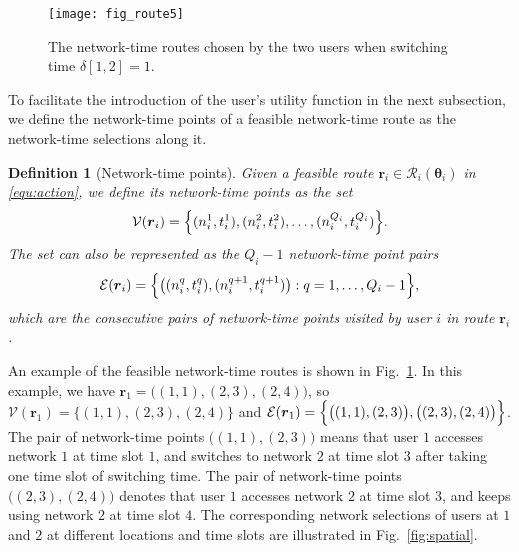 \documentclass[journal]{IEEEtran}
\newcommand{\bs}[1]{\boldsymbol{#1}}
\newtheorem{definition}{Definition}
\begin{document}
\begin{figure}[t]
 \centering
	 \texttt{[image: fig\_route5]} %
 \caption{The network-time routes chosen by the two users when switching time $\delta[1,2] = 1$. } %
\label{fig:route}
\end{figure}




  To facilitate the introduction of the user's utility function in the next subsection, %
  we define the network-time points of a feasible network-time route as the network-time selections along it.
	
\begin{definition}[Network-time points]
  Given a feasible route $\boldsymbol{r}_i \in \mathcal{R}_i(\boldsymbol{\theta}_i)$ in \eqref{equ:action}, we define its network-time points as the set
%
\begin{equation} \label{equ:vertices}
	\mathcal{V}(\boldsymbol{r}_i) = \Bigl\{(n_i^{1},t_i^{1}),(n_i^2,t_i^2),\ldots,(n_i^{Q_i},t_i^{Q_i}) \Bigr\}. %
\end{equation}
% 	
  The set can also be represented as the $Q_i-1$ network-time point pairs 
%	
\begin{equation} \label{equ:edges}
	\mathcal{E}(\boldsymbol{r}_i) = \Bigl\{ \bigl( (n_i^{q},t_i^{q}),(n_i^{q+1},t_i^{q+1}) \bigr): q = 1,\ldots,Q_i-1 \Bigr\},
\end{equation}
% 	
which are the consecutive pairs of network-time points visited by user $i$ in route $\bs{r}_i$.
\end{definition}		







  An example of the feasible network-time routes is shown in Fig.~\ref{fig:route}. In this example, we have $\boldsymbol{r}_1 = \bigl( (1,1), (2,3), (2,4) \bigr)$, so $\mathcal{V}(\boldsymbol{r}_1) = \{(1,1), (2,3), (2,4)\}$ and $\mathcal{E}(\boldsymbol{r}_1) = \Bigl\{\bigl( (1,1), (2,3) \bigr), \bigl( (2,3), (2,4) \bigr) \Bigr\}$.
	The pair of network-time points $\bigl( (1,1), (2,3) \bigr)$ means that user $1$ accesses network $1$ at time slot $1$, and switches to  network $2$ at time slot $3$ after taking one time slot of switching time. 
	The pair of network-time points $\bigl( (2,3), (2,4) \bigr)$ denotes that user $1$ accesses network $2$ at time slot $3$, and keeps using network $2$ at time slot $4$.   
	The corresponding network selections of users at $1$ and $2$ at different locations and time slots are illustrated in Fig.~\ref{fig:spatial}.
	
\end{document}
